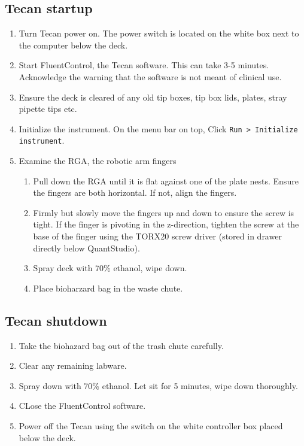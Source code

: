 \documentclass{article}
\begin{document}
\subsection{Tecan startup}
\label{sec:tecan-start}
\begin{enumerate}
\item Turn Tecan power on. The power switch is located on the white box next to the computer below the deck.
\item Start FluentControl, the Tecan software. This can take 3-5 minutes. Acknowledge the warning that the software is not meant of clinical use.
\item Ensure the deck is cleared of any old tip boxes, tip box lids, plates, stray pipette tips etc.
\item Initialize the instrument. On the menu bar on top, Click \texttt{Run > Initialize instrument}.
\item Examine the RGA, the robotic arm fingers
  \begin{enumerate}
  \item Pull down the RGA until it is flat against one of the plate nests. Ensure the fingers are both horizontal. If not, align the fingers.
  \item Firmly but slowly move the fingers up and down to ensure the screw is tight. If the finger is pivoting in the z-direction, tighten the screw at the base of the finger using the TORX20 screw driver (stored in drawer directly below QuantStudio).
  \item Spray deck with 70\% ethanol, wipe down.
  \item Place bioharzard bag in the waste chute.
  \end{enumerate}
\end{enumerate}


\subsection{Tecan shutdown}
\label{sec:tecan-shut}
\begin{enumerate}
\item Take the biohazard bag out of the trash chute carefully.
\item Clear any remaining labware.
\item Spray down with 70\% ethanol. Let sit for 5 minutes, wipe down thoroughly.
\item CLose the FluentControl software.
\item Power off the Tecan using the switch on the white controller box placed below the deck.
\end{enumerate}
\end{document}
